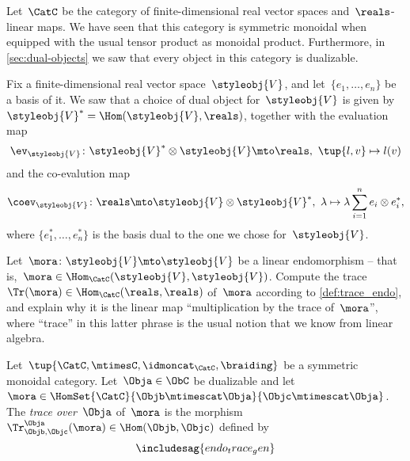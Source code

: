 \begin{gradedexercise}\label{ex:LinearAlgebraTrace}
Let~$\CatC$ be the category of finite-dimensional real vector spaces and~$\reals$-linear maps.
We have seen that this category is symmetric monoidal when equipped with the usual tensor product as monoidal product.
Furthermore, in \cref{sec:dual-objects} we saw that every object in this category is dualizable.

Fix a finite-dimensional real vector space~$\styleobj{V}$, and let~$\{e_1,\ldots,e_n \}$ be a basis of it.
We saw that a choice of dual object for~$\styleobj{V}$ is given by~$\styleobj{V}^* = \Hom(\styleobj{V}, \reals)$, together with the evaluation map
\begin{equation}
\ev_\styleobj{V}  \colon \styleobj{V}^* \otimes \styleobj{V}  \mto \reals, \ \tup{l, v} \mapsto l(v)
\end{equation}
and the co-evalution map
\begin{equation}
\coev_\styleobj{V}  \colon \reals \mto \styleobj{V}  \otimes \styleobj{V}^*, \ \lambda \mapsto \lambda \sum_{i=1}^n e_i \otimes e_i^*,
\end{equation}
where $\{e_1^*,\ldots,e_n^* \}$ is the basis dual to the one we chose for~$\styleobj{V}$.

Let~$\mora\colon \styleobj{V} \mto \styleobj{V}$ be a linear endomorphism -- that is,~$\mora \in \Hom_\CatC(\styleobj{V}, \styleobj{V})$.
Compute the trace~$\Tr(\mora) \in \Hom_\CatC(\reals, \reals)$ of~$\mora$ according to \cref{def:trace_endo}, and explain why it is the linear map ``multiplication by the trace of~$\mora$'', where ``trace'' in this latter phrase is the usual notion that we know from linear algebra.
\end{gradedexercise}



\begin{ctdefinition}
  \label{def:trace_gen_endo}
Let~$\tup{\CatC,\mtimesC,\idmoncat_{\CatC}, \braiding}$ be a symmetric monoidal category.
Let~$\Obja \in \ObC$ be dualizable and let~$\mora \in \HomSet{\CatC}{\Objb \mtimescat \Obja}{\Objc \mtimescat \Obja}$.
The \emph{trace over}~$\Obja$ of~$\mora$ is the morphism~$\Tr_{\Objb, \Objc}^\Obja (\mora) \in \Hom(\Objb, \Objc)$ defined by
  \begin{equation}
\includesag{endo_trace_gen}
\end{equation}
\end{ctdefinition}

